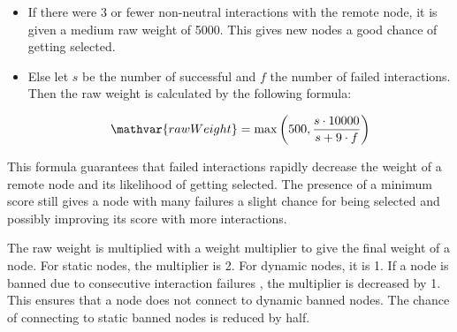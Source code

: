 \begin{itemize}
	\item{
		If there were 3 or fewer non-neutral interactions with the remote node, it is given a medium raw weight of 5000.
		This gives new nodes a good chance of getting selected.
	}
	\item{
		Else let $s$ be the number of successful and $f$ the number of failed interactions.
		Then the raw weight is calculated by the following formula:

		\begin{figure}[t!]
		\end{figure}

		\begin{align*}
			\mathvar{rawWeight} = \max\left(500, \frac{s \cdot 10000}{s + 9 \cdot f}\right)
		\end{align*}
	}
\end{itemize}

This formula guarantees that failed interactions rapidly decrease the weight of a remote node and its likelihood of getting selected.
The presence of a minimum score still gives a node with many failures a slight chance for being selected and possibly improving its score with more interactions.

The raw weight is multiplied with a weight multiplier to give the final weight of a node.
For static nodes, the multiplier is 2.
For dynamic nodes, it is 1.
If a node is banned due to consecutive interaction failures , the multiplier is decreased by 1.
This ensures that a node does not connect to dynamic banned nodes.
The chance of connecting to static banned nodes is reduced by half.

